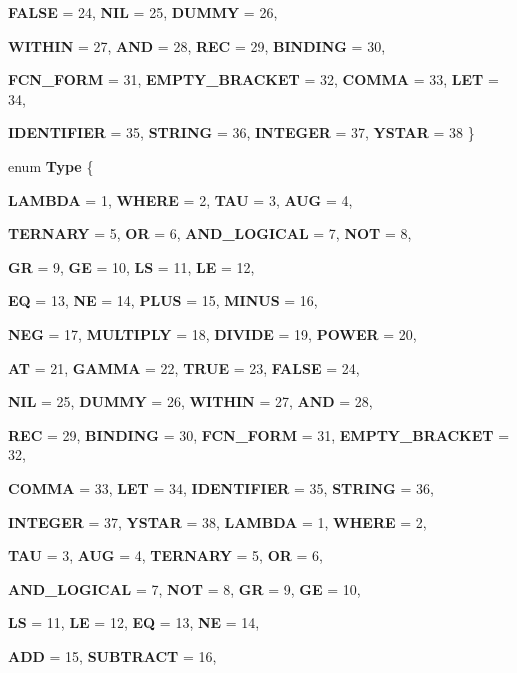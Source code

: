 \begin{DoxyCompactItemize}
{\bfseries FALSE} =  24, 
{\bfseries NIL} =  25, 
{\bfseries DUMMY} =  26, 
\par
{\bfseries WITHIN} =  27, 
{\bfseries AND} =  28, 
{\bfseries REC} =  29, 
{\bfseries BINDING} =  30, 
\par
{\bfseries FCN\_\-FORM} =  31, 
{\bfseries EMPTY\_\-BRACKET} =  32, 
{\bfseries COMMA} =  33, 
{\bfseries LET} =  34, 
\par
{\bfseries IDENTIFIER} =  35, 
{\bfseries STRING} =  36, 
{\bfseries INTEGER} =  37, 
{\bfseries YSTAR} =  38
 \}
\item 
enum {\bfseries Type} \{ \par
{\bfseries LAMBDA} =  1, 
{\bfseries WHERE} =  2, 
{\bfseries TAU} =  3, 
{\bfseries AUG} =  4, 
\par
{\bfseries TERNARY} =  5, 
{\bfseries OR} =  6, 
{\bfseries AND\_\-LOGICAL} =  7, 
{\bfseries NOT} =  8, 
\par
{\bfseries GR} =  9, 
{\bfseries GE} =  10, 
{\bfseries LS} =  11, 
{\bfseries LE} =  12, 
\par
{\bfseries EQ} =  13, 
{\bfseries NE} =  14, 
{\bfseries PLUS} =  15, 
{\bfseries MINUS} =  16, 
\par
{\bfseries NEG} =  17, 
{\bfseries MULTIPLY} =  18, 
{\bfseries DIVIDE} =  19, 
{\bfseries POWER} =  20, 
\par
{\bfseries AT} =  21, 
{\bfseries GAMMA} =  22, 
{\bfseries TRUE} =  23, 
{\bfseries FALSE} =  24, 
\par
{\bfseries NIL} =  25, 
{\bfseries DUMMY} =  26, 
{\bfseries WITHIN} =  27, 
{\bfseries AND} =  28, 
\par
{\bfseries REC} =  29, 
{\bfseries BINDING} =  30, 
{\bfseries FCN\_\-FORM} =  31, 
{\bfseries EMPTY\_\-BRACKET} =  32, 
\par
{\bfseries COMMA} =  33, 
{\bfseries LET} =  34, 
{\bfseries IDENTIFIER} =  35, 
{\bfseries STRING} =  36, 
\par
{\bfseries INTEGER} =  37, 
{\bfseries YSTAR} =  38, 
{\bfseries LAMBDA} =  1, 
{\bfseries WHERE} =  2, 
\par
{\bfseries TAU} =  3, 
{\bfseries AUG} =  4, 
{\bfseries TERNARY} =  5, 
{\bfseries OR} =  6, 
\par
{\bfseries AND\_\-LOGICAL} =  7, 
{\bfseries NOT} =  8, 
{\bfseries GR} =  9, 
{\bfseries GE} =  10, 
\par
{\bfseries LS} =  11, 
{\bfseries LE} =  12, 
{\bfseries EQ} =  13, 
{\bfseries NE} =  14, 
\par
{\bfseries ADD} =  15, 
{\bfseries SUBTRACT} =  16, 

\end{DoxyCompactItemize}
